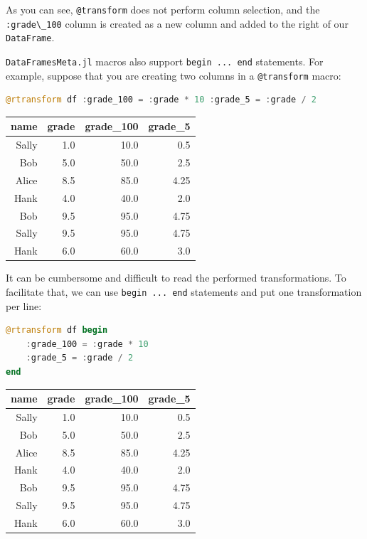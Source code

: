 \documentclass[
  notoc %
]{tufte-book}
\newcommand{\passthrough}[1]{#1}
\begin{document}
As you can see, \passthrough{\lstinline!@transform!} does not perform
column selection, and the \passthrough{\lstinline!:grade\_100!} column
is created as a new column and added to the right of our
\passthrough{\lstinline!DataFrame!}.

\passthrough{\lstinline!DataFramesMeta.jl!} macros also support
\passthrough{\lstinline!begin ... end!} statements. For example, suppose
that you are creating two columns in a
\passthrough{\lstinline!@transform!} macro:

\begin{lstlisting}[language=Julia]
@rtransform df :grade_100 = :grade * 10 :grade_5 = :grade / 2
\end{lstlisting}

\begin{longtable}[]{@{}rrrr@{}}
\toprule()
name & grade & grade\_100 & grade\_5 \\
\midrule()
\endhead
Sally & 1.0 & 10.0 & 0.5 \\
Bob & 5.0 & 50.0 & 2.5 \\
Alice & 8.5 & 85.0 & 4.25 \\
Hank & 4.0 & 40.0 & 2.0 \\
Bob & 9.5 & 95.0 & 4.75 \\
Sally & 9.5 & 95.0 & 4.75 \\
Hank & 6.0 & 60.0 & 3.0 \\
\bottomrule()
\end{longtable}

It can be cumbersome and difficult to read the performed
transformations. To facilitate that, we can use
\passthrough{\lstinline!begin ... end!} statements and put one
transformation per line:

\begin{lstlisting}[language=Julia]
@rtransform df begin
    :grade_100 = :grade * 10
    :grade_5 = :grade / 2
end
\end{lstlisting}

\begin{longtable}[]{@{}rrrr@{}}
\toprule()
name & grade & grade\_100 & grade\_5 \\
\midrule()
\endhead
Sally & 1.0 & 10.0 & 0.5 \\
Bob & 5.0 & 50.0 & 2.5 \\
Alice & 8.5 & 85.0 & 4.25 \\
Hank & 4.0 & 40.0 & 2.0 \\
Bob & 9.5 & 95.0 & 4.75 \\
Sally & 9.5 & 95.0 & 4.75 \\
Hank & 6.0 & 60.0 & 3.0 \\
\bottomrule()
\end{longtable}
\end{document}
